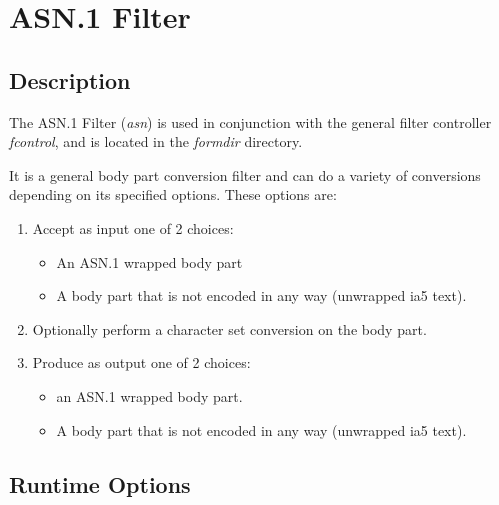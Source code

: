 
\section {ASN.1 Filter}

\bigskip
\subsection {Description}
\medskip
\noindent The ASN.1 Filter ({\em asn}) is used in conjunction with the 
general filter controller {\em fcontrol}, and is located in the 
{\em formdir} directory.

\medskip
\noindent It is a general body part conversion filter and can do 
a variety of conversions depending on its specified options.
These options are:

\begin {enumerate}

\item Accept as input one of 2 choices: 
\begin {itemize}
\item An ASN.1 wrapped body part 
\item A body part that is not encoded in any way (unwrapped ia5 text).
\end{itemize}

\item Optionally perform a character set conversion on the body part. 

\item Produce as output one of 2 choices:
\begin {itemize}
\item an ASN.1 wrapped body part.
\item A body part that is not encoded in any way (unwrapped ia5 text).
\end {itemize}
\end {enumerate}


\bigskip\bigskip
\subsection {Runtime Options}
\medskip


